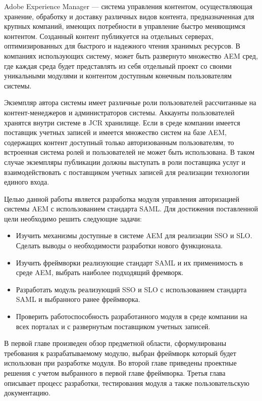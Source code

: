 \Introduction

Adobe Experience Manager — система управления контентом, осуществляющая хранение, обработку и доставку различных видов контента, предназначенная для крупных компаний, имеющих потребности в управление быстро меняющимся контентом. Созданный контент публикуется на отдельных серверах, оптимизированных для быстрого и надежного чтения хранимых ресурсов. В компаниях использующих систему, может быть развернуто множество AEM сред, где каждая среда будет представлять из себя отдельный проект со своими уникальными модулями и контентом доступным конечным пользователям системы. 

Экземпляр автора системы имеет различные роли пользователей рассчитанные на контент-менеджеров и администраторов системы. Аккаунты пользователей хранятся внутри системе в JCR хранилище. Если в среде компании имеется поставщик учетных записей и имеется множество систем на базе AEM, содержащих контент доступный только авторизованным пользователям, то встроенная система ролей и пользователей не может быть использована. В таком случае экземпляры публикации должны выступать в роли поставщика услуг и взаимодействовать с поставщиком учетных записей для реализации технологии единого входа.

Целью данной работы является разработка модуля управления авторизацией системы AEM с использованием стандарта SAML. Для достижения поставленной цели необходимо решить следующие задачи:

\begin{itemize}
\item Изучить механизмы доступные в системе AEM для реализации SSO и SLO. Сделать выводы о необходимости разработки нового функционала.
\item Изучить фреймворки реализующие стандарт SAML и их применимость в среде AEM, выбрать наиболее подходящий фремворк.
\item Разработать модуль реализующий SSO и SLO с использованием стандарта SAML и выбранного ранее фреймворка.
\item Проверить работоспособность разработанного модуля в среде компании на всех порталах и с развернутым поставщиком учетных записей.
\end{itemize}

В первой главе произведен обзор предметной области, сформулированы требования к разрабатываемому модулю, выбран фреймворк который будет использован при разработке модуля. Во второй главе приведены проектные решения с учетом выбранного в первой главе фреймворка. Третья глава описывает процесс разработки, тестирования модуля а также пользовательскую документацию.